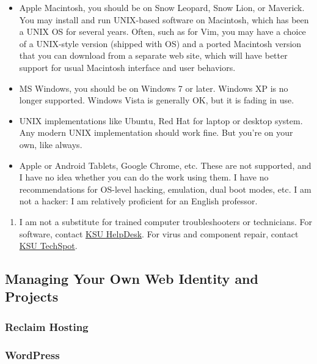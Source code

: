 \documentclass[]{article}
\begin{document}
\begin{itemize}
\itemsep1pt\parskip0pt
\item
  Apple Macintosh, you should be on Snow Leopard, Snow Lion, or
  Maverick. You may install and run UNIX-based software on Macintosh,
  which has been a UNIX OS for several years. Often, such as for Vim,
  you may have a choice of a UNIX-style version (shipped with OS) and a
  ported Macintosh version that you can download from a separate web
  site, which will have better support for usual Macintosh interface and
  user behaviors.
\item
  MS Windows, you should be on Windows 7 or later. Windows XP is no
  longer supported. Windows Vista is generally OK, but it is fading in
  use.
\item
  UNIX implementations like Ubuntu, Red Hat for laptop or desktop
  system. Any modern UNIX implementation should work fine. But you're on
  your own, like always.
\item
  Apple or Android Tablets, Google Chrome, etc. These are not supported,
  and I have no idea whether you can do the work using them. I have no
  recommendations for OS-level hacking, emulation, dual boot modes, etc.
  I am not a hacker: I am relatively proficient for an English
  professor.\\
\end{itemize}

\begin{enumerate}
\def\labelenumi{\arabic{enumi}.}
\setcounter{enumi}{4}
\itemsep1pt\parskip0pt
\item
  I am not a substitute for trained computer troubleshooters or
  technicians. For software, contact \href{http://support.kent.edu}{KSU
  HelpDesk}. For virus and component repair, contact
  \href{http://www2.kent.edu/is/support/thetechspot/index.cfm}{KSU
  TechSpot}.
\end{enumerate}

\subsection{Managing Your Own Web Identity and
Projects}\label{managing-your-own-web-identity-and-projects}

\subsubsection{Reclaim Hosting}\label{reclaim-hosting}

\subsubsection{WordPress}\label{wordpress}
\end{document}

